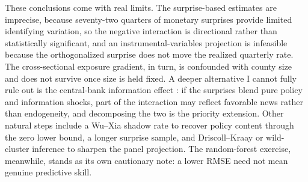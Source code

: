\documentclass[11pt]{article}
\begin{document}
These conclusions come with real limits. The surprise-based estimates are imprecise, because
seventy-two quarters of monetary surprises provide limited identifying variation, so the negative
interaction is directional rather than statistically significant, and an instrumental-variables
projection is infeasible because the orthogonalized surprise does not move the realized quarterly
rate. The cross-sectional exposure gradient, in turn, is confounded with county size and does not
survive once size is held fixed. A deeper alternative I cannot fully rule out is the central-bank
information effect \citep{nakamura2018,jarocinski2020}: if the surprises blend pure policy and
information shocks, part of the interaction may reflect favorable news rather than endogeneity,
and decomposing the two is the priority extension. Other natural steps include a Wu--Xia shadow
rate \citep{wuxia2016} to recover policy content through the zero lower bound, a longer surprise
sample, and Driscoll--Kraay or wild-cluster inference to sharpen the panel projection. The
random-forest exercise, meanwhile, stands as its own cautionary note: a lower RMSE need not mean
genuine predictive skill.
\end{document}
